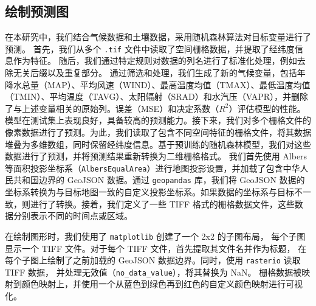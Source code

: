 \documentclass[AutoFakeBold]{LZUThesis-PgD&PhD}
\begin{document}
	\subsection{绘制预测图}
	\par
	在本研究中，我们结合气候数据和土壤数据，采用随机森林算法对目标变量进行了预测。
	首先，我们从多个 \texttt{.tif} 文件中读取了空间栅格数据，并提取了经纬度信息作为特征。
	随后，我们通过特定规则对数据的列名进行了标准化处理，例如去除无关后缀以及重复部分。
	通过筛选和处理，我们生成了新的气候变量，包括年降水总量（MAP）、平均风速（WIND）、最高温度均值（TMAX）、最低温度均值（TMIN）、平均温度（TAVG）、太阳辐射（SRAD）和水汽压（VAPR），并删除了与上述变量相关的原始列。误差（MSE）和决定系数（$R^2$）评估模型的性能。模型在测试集上表现良好，具备较高的预测能力。接下来，我们对多个栅格文件的像素数据进行了预测。为此，我们读取了包含不同空间特征的栅格文件，将其数据堆叠为多维数组，同时保留经纬度信息。基于预训练的随机森林模型，我们对这些数据进行了预测，并将预测结果重新转换为二维栅格格式。
	我们首先使用 Albers 等面积投影坐标系（\texttt{AlbersEqualArea}）进行地图投影设置，并加载了包含中华人民共和国边界的 GeoJSON 数据。通过 \texttt{geopandas} 库，我们将 GeoJSON 数据的坐标系转换为与目标地图一致的自定义投影坐标系。如果数据的坐标系与目标不一致，则进行了转换。接着，我们定义了一些 TIFF 格式的栅格数据文件，这些数据分别表示不同的时间点或区域。
	
	在绘制图形时，我们使用了 \texttt{matplotlib} 创建了一个 2x2 的子图布局，
	每个子图显示一个 TIFF 文件。对于每个 TIFF 文件，首先提取其文件名并作为标题，
	在每个子图上绘制了之前加载的 GeoJSON 数据边界。同时，使用 \texttt{rasterio} 读取 TIFF 数据，
	并处理无效值（\texttt{no\_data\_value}），将其替换为 NaN。
	栅格数据被映射到颜色映射上，并使用一个从蓝色到绿色再到红色的自定义颜色映射进行可视化。
	
	
	
	
	
	
%		
%		
	
	
%		
	
\end{document}
